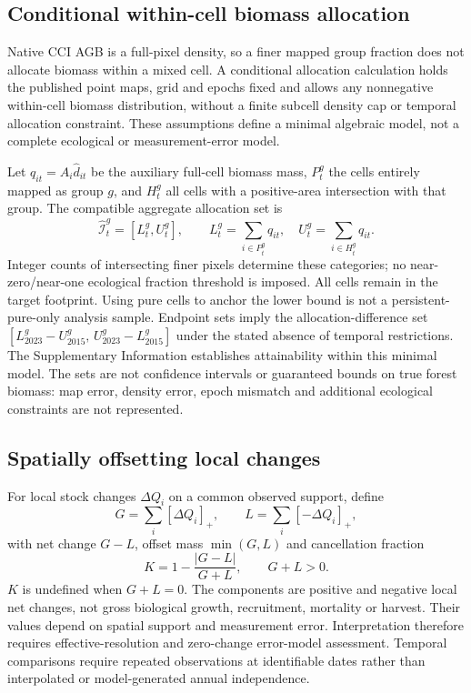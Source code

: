 \documentclass[11pt,a4paper]{article}
\begin{document}
\subsection{Conditional within-cell biomass allocation}
Native CCI AGB is a full-pixel density, so a finer mapped group fraction does not allocate biomass within a mixed cell. A conditional allocation calculation holds the published point maps, grid and epochs fixed and allows any nonnegative within-cell biomass distribution, without a finite subcell density cap or temporal allocation constraint. These assumptions define a minimal algebraic model, not a complete ecological or measurement-error model.

Let $q_{it}=A_i\widehat d_{it}$ be the auxiliary full-cell biomass mass, $P_t^g$ the cells entirely mapped as group $g$, and $H_t^g$ all cells with a positive-area intersection with that group. The compatible aggregate allocation set is
\[
\widehat{\mathcal I}_t^g=[L_t^g,U_t^g],\qquad
L_t^g=\sum_{i\in P_t^g}q_{it},\quad U_t^g=\sum_{i\in H_t^g}q_{it}.
\]
Integer counts of intersecting finer pixels determine these categories; no near-zero/near-one ecological fraction threshold is imposed. All cells remain in the target footprint. Using pure cells to anchor the lower bound is not a persistent-pure-only analysis sample. Endpoint sets imply the allocation-difference set $[L_{2023}^g-U_{2015}^g,\,U_{2023}^g-L_{2015}^g]$ under the stated absence of temporal restrictions. The Supplementary Information establishes attainability within this minimal model. The sets are not confidence intervals or guaranteed bounds on true forest biomass: map error, density error, epoch mismatch and additional ecological constraints are not represented.

\subsection{Spatially offsetting local changes}
For local stock changes $\Delta Q_i$ on a common observed support, define
\[
G=\sum_i[\Delta Q_i]_+,\qquad L=\sum_i[-\Delta Q_i]_+,
\]
with net change $G-L$, offset mass $\min(G,L)$ and cancellation fraction
\begin{equation}
K=1-\frac{|G-L|}{G+L},\qquad G+L>0.\label{eq:cancel}
\end{equation}
$K$ is undefined when $G+L=0$. The components are positive and negative local net changes, not gross biological growth, recruitment, mortality or harvest. Their values depend on spatial support and measurement error. Interpretation therefore requires effective-resolution and zero-change error-model assessment. Temporal comparisons require repeated observations at identifiable dates rather than interpolated or model-generated annual independence.
\end{document}
